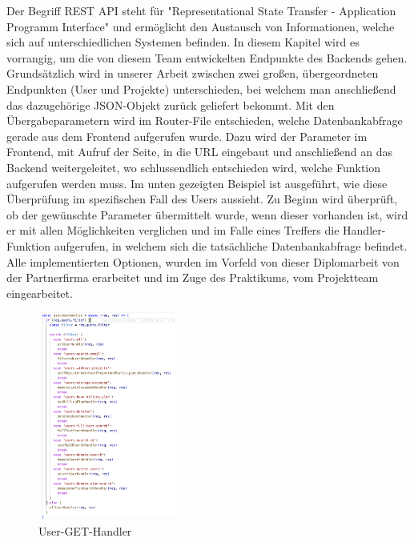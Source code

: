 Der Begriff REST API steht für "Representational State Transfer - Application Programm Interface" und ermöglicht den Austausch von Informationen, welche sich auf unterschiedlichen Systemen befinden. In diesem Kapitel wird es vorrangig, um die von diesem Team entwickelten Endpunkte des Backends gehen. Grundsätzlich wird in unserer Arbeit zwischen zwei großen, übergeordneten Endpunkten (User und Projekte) unterschieden, bei welchem man anschließend das dazugehörige JSON-Objekt zurück geliefert bekommt. Mit den Übergabeparametern wird im Router-File entschieden, welche Datenbankabfrage gerade aus dem Frontend aufgerufen wurde. Dazu wird der Parameter im Frontend, mit Aufruf der Seite, in die URL eingebaut und anschließend an das Backend weitergeleitet, wo schlussendlich entschieden wird, welche Funktion aufgerufen werden muss.
\newline
Im unten gezeigten Beispiel ist ausgeführt, wie diese Überprüfung im spezifischen Fall des Users aussieht. Zu Beginn wird überprüft, ob der gewünschte Parameter übermittelt wurde, wenn dieser vorhanden ist, wird er mit allen Möglichkeiten verglichen und im Falle eines Treffers die Handler-Funktion aufgerufen, in welchem sich die tatsächliche Datenbankabfrage befindet. Alle implementierten Optionen, wurden im Vorfeld von dieser Diplomarbeit von der Partnerfirma erarbeitet und im Zuge des Praktikums, vom Projektteam eingearbeitet.
\newline
\begin{figure}[h!]
    \centering
    \includegraphics[width=0.4\textwidth]{pics/REST_API_Img.png}
    \caption{User-GET-Handler}
    \label{fig:enter-label}
\end{figure}